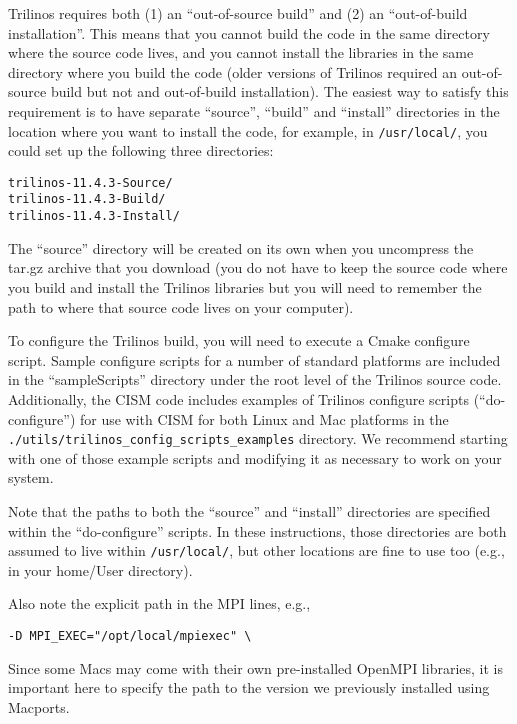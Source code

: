 Trilinos requires both (1) an ``out-of-source build'' and (2) an ``out-of-build installation''. 
This means that you cannot build the code in the same directory where the source code lives, 
and you cannot install the libraries in the same directory where you build the code 
(older versions of Trilinos required an out-of-source build but not and out-of-build installation). 
The easiest way to satisfy this requirement is to have separate ``source'', ``build'' and 
``install'' directories in the location where you want to install the code, 
for example, in \texttt{/usr/local/}, you could set up the following three directories:

\begin{verbatim}
trilinos-11.4.3-Source/
trilinos-11.4.3-Build/
trilinos-11.4.3-Install/
\end{verbatim}

The ``source'' directory will be created on its own when you uncompress the tar.gz archive 
that you download (you do not have to keep the source code where you build and install 
the Trilinos libraries but you will need to remember the path to where that source code 
lives on your computer). 

To configure the Trilinos build, you will need to execute a Cmake configure script. 
Sample configure scripts for a number of standard platforms are included in the ``sampleScripts''
 directory under the root level of the Trilinos source code. 
Additionally, the CISM code includes examples of Trilinos configure scripts (``do-configure'') 
for use with CISM for both Linux and Mac platforms in the 
\texttt{./utils/trilinos\_config\_scripts\_examples} directory. 
We recommend starting with one of those example scripts and modifying it as
necessary to work on your system.

Note that the paths to both the ``source'' and ``install'' directories are specified within the ``do-configure'' scripts. In these instructions, those directories are both assumed to live within \texttt{/usr/local/},
but other locations are fine to use too (e.g., in your home/User directory).

\begin{mdframed}[style=mac] %
Also note the explicit path in the MPI lines, e.g.,

\begin{verbatim}
-D MPI_EXEC="/opt/local/mpiexec" \
\end{verbatim}

Since some Macs may come with their own pre-installed OpenMPI libraries, it is important here to specify the path to the version we previously installed using Macports.
\end{mdframed}              %

